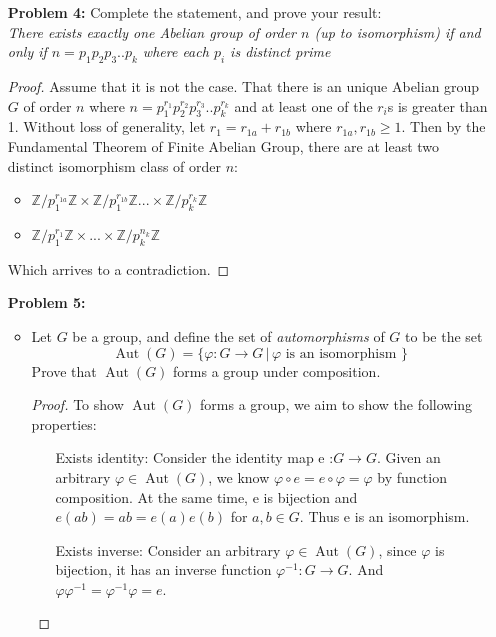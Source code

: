 \documentclass[11pt, oneside]{article}
\newcommand{\Z}{\mathbb Z}
\newcommand{\Aut}{\operatorname{Aut}}
\begin{document}
\begin{enumerate}
\begin{enumerate}
\begin{itemize}
    \end{itemize}
\end{enumerate}

\newpage
\item[{\bf Problem 4:}] Complete the statement, and prove your result: \\


{\it There exists exactly one Abelian group of order $n$ (up to isomorphism) if and only if $n=p_1p_2p_3..p_k$ where each $p_i$ is distinct prime }


\hrulefill

\begin{proof}
Assume that it is not the case. That there is an unique Abelian group $G$ of order $n$ where $n=p_1^{r_1}p_2^{r_2}p_3^{r_3}..p_k^{r_k}$ and at least one of the $r_i$s is greater than 1. Without loss of generality, let $r_1=r_{1a}+r_{1b}$ where $r_{1a}, r_{1b}\geq 1$. Then by the Fundamental Theorem of Finite Abelian Group, there are at least two distinct isomorphism class of order $n$: \begin{itemize}
    \item $\Z/p_1^{r_{1a}}\Z \times \Z/p_1^{r_{1b}}\Z...\times\Z/p_k^{r_k}\Z$
    \item $\Z/p_1^{r_1}\Z \times ...\times\Z/p_k^{n_k}\Z$
\end{itemize}
Which arrives to a contradiction. 
\end{proof}

\newpage
\item[{\bf Problem 5:}] 
\begin{itemize}
\item Let $G$ be a group, and define the set of {\it automorphisms} of $G$ to be the set $$\Aut(G) = \{\varphi:G\rightarrow G\,|\, \varphi \text{ is an isomorphism }\}$$
Prove that $\Aut(G)$ forms a group under composition.
\begin{proof}
To show $\Aut(G)$ forms a group, we aim to show the following properties: \begin{itemize}
    \item[Exists identity:] Consider the identity map e :$G\rightarrow G$. Given an arbitrary $\varphi\in \Aut(G)$, we know $\varphi \circ e= e \circ \varphi =\varphi$ by function composition. At the same time, e is bijection and $e(ab)=ab=e(a)e(b)$ for $a,b\in G$. Thus e is an isomorphism.
    \item[Exists inverse:] Consider an arbitrary $\varphi \in \Aut(G)$, since $\varphi$ is bijection, it has an inverse function $\varphi^{-1}: G\rightarrow G$. And $\varphi\varphi^{-1}=\varphi^{-1}\varphi=e$.
    

\end{itemize}
\end{proof}
\end{itemize}
\end{enumerate}
\end{document}

